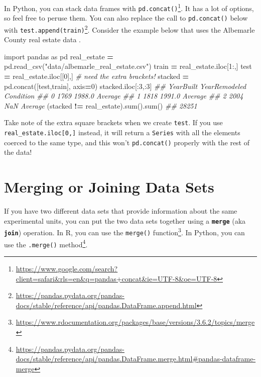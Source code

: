 \documentclass[12pt,krantz2]{krantz}
\makeatletter
\newenvironment{Shaded}{\begin{snugshade}}{\end{snugshade}}
\newcommand{\BuiltInTok}[1]{#1}
\newcommand{\CommentTok}[1]{\textcolor[rgb]{0.37,0.37,0.37}{\textit{#1}}}
\newcommand{\DecValTok}[1]{\textcolor[rgb]{0.06,0.06,0.06}{#1}}
\newcommand{\ImportTok}[1]{#1}
\newcommand{\NormalTok}[1]{#1}
\newcommand{\OperatorTok}[1]{\textcolor[rgb]{0.43,0.43,0.43}{\textbf{#1}}}
\newcommand{\StringTok}[1]{\textcolor[rgb]{0.5,0.5,0.5}{#1}}
\renewcommand{\href}[2]{#2\footnote{\url{#1}}}
\newenvironment{kframe}{%
\medskip{}
\setlength{\fboxsep}{.8em}
 \def\at@end@of@kframe{}%
 \ifinner\ifhmode%
  \def\at@end@of@kframe{\end{minipage}}%
  \begin{minipage}{\columnwidth}%
 \fi\fi%
 \def\FrameCommand##1{\hskip\@totalleftmargin \hskip-\fboxsep
 \colorbox{shadecolor}{##1}\hskip-\fboxsep
     \hskip-\linewidth \hskip-\@totalleftmargin \hskip\columnwidth}%
 \MakeFramed {\advance\hsize-\width
   \@totalleftmargin\z@ \linewidth\hsize
   \@setminipage}}%
 {\par\unskip\endMakeFramed%
 \at@end@of@kframe}
\renewenvironment{Shaded}{\begin{kframe}}{\end{kframe}}
\makeatother
\begin{document}
In Python, you can stack data frames with \href{https://www.google.com/search?client=safari\&rls=en\&q=pandas+concat\&ie=UTF-8\&oe=UTF-8}{\texttt{pd.concat()}}. It has a lot of options, so feel free to peruse them. You can also replace the call to \texttt{pd.concat()} below with \href{https://pandas.pydata.org/pandas-docs/stable/reference/api/pandas.DataFrame.append.html}{\texttt{test.append(train)}}. Consider the example below that uses the Albemarle County real estate data \citep{albemarle_county_gis_web} \citep{clay_ford}.

\begin{Shaded}
\begin{Highlighting}[]
\ImportTok{import}\NormalTok{ pandas }\ImportTok{as}\NormalTok{ pd}
\NormalTok{real_estate }\OperatorTok{=}\NormalTok{ pd.read_csv(}\StringTok{"data/albemarle_real_estate.csv"}\NormalTok{)}
\NormalTok{train }\OperatorTok{=}\NormalTok{ real_estate.iloc[}\DecValTok{1}\NormalTok{:,]}
\NormalTok{test }\OperatorTok{=}\NormalTok{ real_estate.iloc[[}\DecValTok{0}\NormalTok{],] }\CommentTok{# need the extra brackets!}
\NormalTok{stacked }\OperatorTok{=}\NormalTok{ pd.concat([test,train], axis}\OperatorTok{=}\DecValTok{0}\NormalTok{)}
\NormalTok{stacked.iloc[:}\DecValTok{3}\NormalTok{,:}\DecValTok{3}\NormalTok{]}
\CommentTok{##    YearBuilt  YearRemodeled Condition}
\CommentTok{## 0       1769         1988.0   Average}
\CommentTok{## 1       1818         1991.0   Average}
\CommentTok{## 2       2004            NaN   Average}
\NormalTok{(stacked }\OperatorTok{!=}\NormalTok{ real_estate).}\BuiltInTok{sum}\NormalTok{().}\BuiltInTok{sum}\NormalTok{()}
\CommentTok{## 28251}
\end{Highlighting}
\end{Shaded}

Take note of the extra square brackets when we create \texttt{test}. If you use \texttt{real\_estate.iloc{[}0,{]}} instead, it will return a \texttt{Series} with all the elements coerced to the same type, and this won't \texttt{pd.concat()} properly with the rest of the data!

\hypertarget{merging-or-joining-data-sets}{%
\section{Merging or Joining Data Sets}\label{merging-or-joining-data-sets}}

If you have two different data sets that provide information about the same experimental units, you can put the two data sets together using a \textbf{\texttt{merge}} (aka \textbf{\texttt{join}}) operation. In R, you can use the \href{https://www.rdocumentation.org/packages/base/versions/3.6.2/topics/merge}{\texttt{merge()} function}. In Python, you can use the \href{https://pandas.pydata.org/pandas-docs/stable/reference/api/pandas.DataFrame.merge.html\#pandas-dataframe-merge}{\texttt{.merge()} method}.
\end{document}
